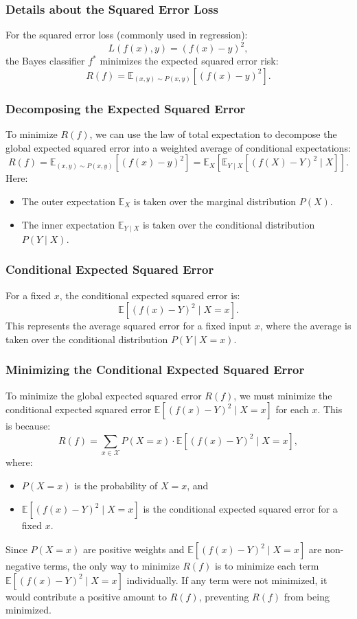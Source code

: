 \begin{notechapter}
\subsubsection{Details about the Squared Error Loss}\label{intro-to-ml:sec:squared_error_loss}

For the squared error loss (commonly used in regression):
\[
L(f(x), y) = (f(x) - y)^2,
\]
the Bayes classifier \( f^* \) minimizes the expected squared error risk:
\[
R(f) = \mathbb{E}_{(x,y) \sim P(x,y)}[(f(x) - y)^2].
\]

\subsubsection{Decomposing the Expected Squared Error}
To minimize \( R(f) \), we can use the law of total expectation to decompose the global expected squared error into a weighted average of conditional expectations:
\[
R(f) = \mathbb{E}_{(x,y) \sim P(x,y)}[(f(x) - y)^2] = \mathbb{E}_{X}[\mathbb{E}_{Y \mid X}[(f(X) - Y)^2 \mid X]].
\]
Here:
\begin{itemize}
    \item The outer expectation \( \mathbb{E}_{X} \) is taken over the marginal distribution \( P(X) \).
    \item The inner expectation \( \mathbb{E}_{Y \mid X} \) is taken over the conditional distribution \( P(Y \mid X) \).
\end{itemize}

\subsubsection{Conditional Expected Squared Error}
For a fixed \( x \), the conditional expected squared error is:
\[
\mathbb{E}[(f(x) - Y)^2 \mid X = x].
\]
This represents the average squared error for a fixed input \( x \), where the average is taken over the conditional distribution \( P(Y \mid X = x) \).

\subsubsection{Minimizing the Conditional Expected Squared Error}
To minimize the global expected squared error \( R(f) \), we must minimize the conditional expected squared error \( \mathbb{E}[(f(x) - Y)^2 \mid X = x] \) for each \( x \). This is because:
\[
R(f) = \sum_{x \in \mathcal{X}} P(X = x) \cdot \mathbb{E}[(f(x) - Y)^2 \mid X = x],
\]
where:
\begin{itemize}
    \item \( P(X = x) \) is the probability of \( X = x \), and
    \item \( \mathbb{E}[(f(x) - Y)^2 \mid X = x] \) is the conditional expected squared error for a fixed \( x \).
\end{itemize}
Since \( P(X = x) \) are positive weights and \( \mathbb{E}[(f(x) - Y)^2 \mid X = x] \) are non-negative terms, the only way to minimize \( R(f) \) is to minimize each term \( \mathbb{E}[(f(x) - Y)^2 \mid X = x] \) individually. If any term were not minimized, it would contribute a positive amount to \( R(f) \), preventing \( R(f) \) from being minimized.


\end{notechapter}
